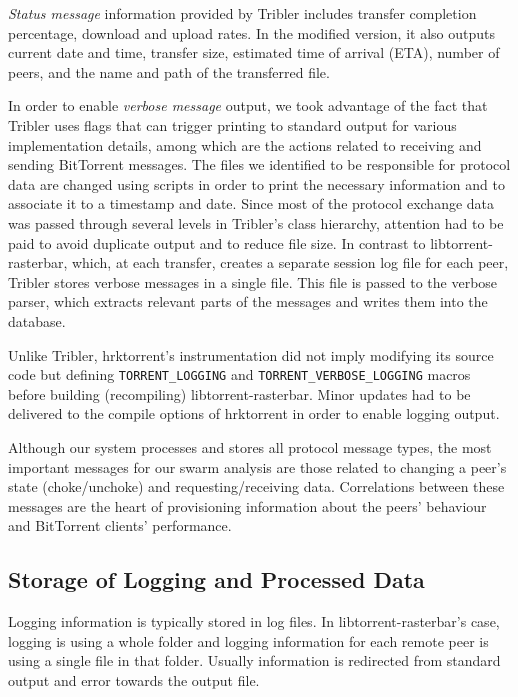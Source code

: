 \textit{Status message} information provided by Tribler includes transfer
completion percentage, download and upload rates. In the modified version, it
also outputs current date and time, transfer size, estimated time of arrival
(ETA), number of peers, and the name and path of the transferred file.

In order to enable \textit{verbose message} output, we took advantage of the
fact that Tribler uses flags that can trigger printing to standard output for
various implementation details, among which are the actions related to
receiving and sending BitTorrent messages. The files we identified to be
responsible for protocol data are changed using scripts in order to print the
necessary information and to associate it to a timestamp and date. Since most
of the protocol exchange data was passed through several levels in Tribler's
class hierarchy, attention had to be paid to avoid duplicate output and to
reduce file size. In contrast to libtorrent-rasterbar, which, at each transfer,
creates a separate session log file for each peer, Tribler stores verbose
messages in a single file. This file is passed to the verbose parser, which
extracts relevant parts of the messages and writes them into the database.

Unlike Tribler, hrktorrent's instrumentation did not imply modifying its
source code but defining \texttt{TORRENT\_LOGGING} and
\texttt{TORRENT\_VERBOSE\_LOGGING} macros before building (recompiling)
libtorrent-rasterbar. Minor updates had to be delivered to the compile options
of hrktorrent in order to enable logging output.

Although our system processes and stores all protocol message types,
the most important messages for our swarm analysis are those related to
changing a peer's state (choke/unchoke) and requesting/receiving data.
Correlations between these messages are the heart of provisioning information
about the peers' behaviour and BitTorrent clients' performance.

\subsection{Storage of Logging and Processed Data}

Logging information is typically stored in log files. In
libtorrent-rasterbar's case, logging is using a whole folder and logging
information for each remote peer is using a single file in that folder.
Usually information is redirected from standard output and error towards the
output file.

